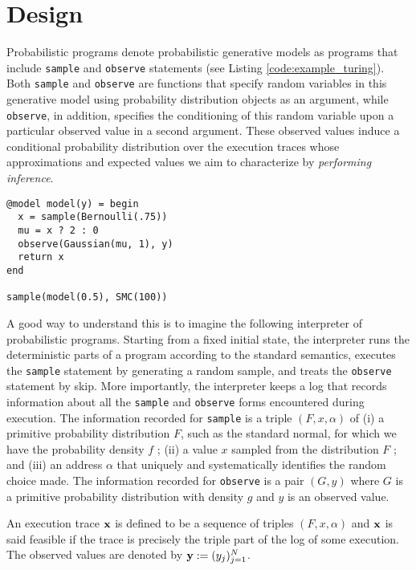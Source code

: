 \section{Design}

Probabilistic programs denote probabilistic generative models as programs that include \texttt{sample} and \texttt{observe} statements (see Listing \ref{code:example_turing}). Both \texttt{sample} and \texttt{observe} are functions that specify random variables in this generative model using probability distribution objects as an argument, while \texttt{observe}, in addition, specifies the conditioning of this random variable upon a particular observed value in a second argument. These observed values induce a conditional probability distribution over the execution traces whose approximations and expected values we aim to characterize by \textit{performing inference}. \\

\begin{lstlisting}[caption={Example of a Turing.jl model},captionpos=b,label=code:example_turing]
@model model(y) = begin
  x = sample(Bernoulli(.75))
  mu = x ? 2 : 0
  observe(Gaussian(mu, 1), y)
  return x
end

sample(model(0.5), SMC(100))
\end{lstlisting}

A good way to understand this is to imagine the following interpreter of probabilistic programs. Starting from a fixed initial state, the interpreter runs the deterministic parts of a program according to the standard semantics, executes the \texttt{sample} statement by generating a random sample, and treats the \texttt{observe} statement by skip. More importantly, the interpreter keeps a log that records information about all the \texttt{sample} and \texttt{observe} forms encountered during execution. The information recorded for \texttt{sample} is a triple $(F, x, \alpha)$ of (i) a primitive probability distribution $F$, such as the standard normal, for which we have the probability density $f$ ; (ii) a value $x$ sampled from the distribution $F$ ; and (iii) an address $\alpha$ that uniquely and systematically identifies the random choice made. The information recorded for \texttt{observe} is a pair $(G,y)$ where $G$ is a primitive probability distribution with density $g$ and $y$ is an observed value.

An execution trace $\boldsymbol{\mathbf{x}}$ is defined to be a sequence of triples $(F, x, \alpha)$ and $\boldsymbol{\mathbf{x}}$ is said feasible if the trace is precisely the triple part of the log of some execution.
The observed values are denoted by $\boldsymbol{\mathbf{y}} := (y_j)_{j=1}^N$.


